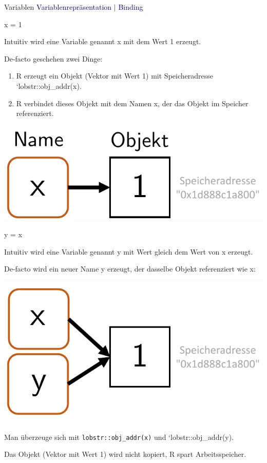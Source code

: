 \documentclass[
  8pt,
  ignorenonframetext,
]{beamer}
\newenvironment{Shaded}{\begin{snugshade}}{\end{snugshade}}
\newcommand{\DecValTok}[1]{\textcolor[rgb]{0.00,0.00,0.81}{#1}}
\newcommand{\NormalTok}[1]{#1}
\newcommand{\OtherTok}[1]{\textcolor[rgb]{0.56,0.35,0.01}{#1}}
\providecommand{\tightlist}{%
  \setlength{\itemsep}{0pt}\setlength{\parskip}{0pt}}
\begin{document}
\begin{frame}[fragile]{Variablen}
\protect\hypertarget{variablen-6}{}
\textcolor{darkblue}{Variablenrepräsentation $\vert$ Binding}
\vspace{1mm} \footnotesize {}

\begin{Shaded}
\begin{Highlighting}[]
\NormalTok{x }\OtherTok{=} \DecValTok{1}
\end{Highlighting}
\end{Shaded}

Intuitiv wird eine Variable genannt x mit dem Wert 1 erzeugt.

De-facto geschehen zwei Dinge:

\begin{enumerate}
\tightlist
\item
  R erzeugt ein Objekt (Vektor mit Wert 1) mit Speicheradresse
  `lobstr::obj\_addr(x).
\item
  R verbindet dieses Objekt mit dem Namen x, der das Objekt im Speicher
  referenziert.
\end{enumerate}

\begin{center}\includegraphics[width=0.22\linewidth]{2_Abbildungen/pds_2_binding_1} \end{center}
\vspace{1mm}

\begin{Shaded}
\begin{Highlighting}[]
\NormalTok{y }\OtherTok{=}\NormalTok{ x}
\end{Highlighting}
\end{Shaded}

Intuitiv wird eine Variable genannt y mit Wert gleich dem Wert von x
erzeugt.

De-facto wird ein neuer Name y erzeugt, der dasselbe Objekt referenziert
wie x:

\begin{center}\includegraphics[width=0.22\linewidth]{2_Abbildungen/pds_2_binding_2} \end{center}
\vspace{1mm}

Man überzeuge sich mit \texttt{lobstr::obj\_addr(x)} und
`lobstr::obj\_addr(y).

Das Objekt (Vektor mit Wert 1) wird nicht kopiert, R spart
Arbeitsspeicher.
\end{frame}
\end{document}
